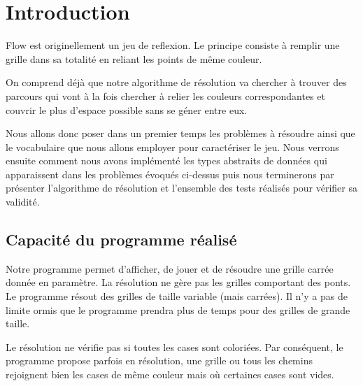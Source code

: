 \section*{Introduction}
Flow est originellement un jeu de reflexion. Le principe consiste à remplir une grille dans sa totalité en reliant les points de même couleur.

On comprend déjà que notre algorithme de résolution va chercher à trouver des parcours qui vont à la fois chercher à relier les couleurs correspondantes et couvrir le plus d'espace possible sans se géner entre eux.

Nous allons donc poser dans un premier temps les problèmes à résoudre ainsi que le vocabulaire que nous allons employer pour caractériser le jeu. Nous verrons ensuite comment nous avons implémenté les types abstraits de données qui apparaissent dans les problèmes évoqués ci-dessus puis nous terminerons par présenter l'algorithme de résolution et l'ensemble des tests réalisés pour vérifier sa validité.

\subsection*{Capacité du programme réalisé}

Notre programme permet d'afficher, de jouer et de résoudre une grille carrée donnée en paramètre.
La résolution ne gère pas les grilles comportant des ponts.
Le programme résout des grilles de taille variable (mais carrées). Il n'y a pas de limite ormis que le programme prendra plus de temps pour des grilles de grande taille.

Le résolution ne vérifie pas si toutes les cases sont coloriées. Par conséquent, le programme propose parfois en résolution, une grille ou tous les chemins rejoignent bien les cases de même couleur mais où certaines cases sont vides.